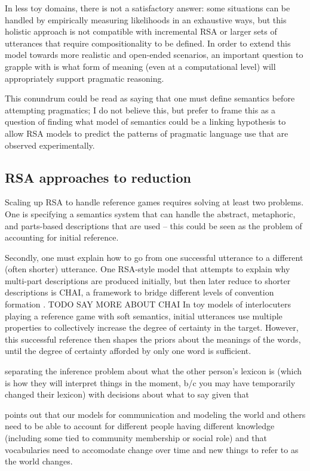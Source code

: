 \documentclass[]{article}
\begin{document}
 In less toy domains, there is not a satisfactory answer: some situations can be handled by empirically measuring likelihoods in an exhaustive ways, but this holistic approach is not compatible with incremental RSA or larger sets of utterances that require compositionality to be defined. In order to extend this model towards more realistic and open-ended scenarios, an important question to grapple with is what form of meaning (even at a computational level) will appropriately support pragmatic reasoning. 
 
This conundrum could be read as saying that one must define semantics before attempting pragmatics; I do not believe this, but prefer to frame this as a question of finding what model of semantics could be a linking hypothesis to allow RSA models to predict the patterns of pragmatic language use that are observed experimentally. 


\subsection{RSA approaches to reduction}
Scaling up RSA to handle reference games requires solving at least two problems. One is specifying a semantics system that can handle the abstract, metaphoric, and parts-based descriptions that are used -- this could be seen as the problem of accounting for initial reference. 

Secondly, one must explain how to go from one successful utterance to a different (often shorter) utterance. One RSA-style model that attempts to explain why multi-part descriptions are produced initially, but then later reduce to shorter descriptions is CHAI,  a framework to bridge different levels of convention formation \cite{hawkins2021}. TODO SAY MORE ABOUT CHAI In toy models of interlocuters playing a reference game with soft semantics, initial utterances use multiple properties to collectively increase the degree of certainty in the target. However, this successful reference then shapes the priors about the meanings of the words, until the degree of certainty afforded by only one word is sufficient. 

\cite{hawkins2021} separating the inference problem about what the other person's lexicon is (which is how they will interpret things in the moment, b/c you may have temporarily changed their lexicon) with decisions about what to say given that 

\cite{hawkins2021} points out that our models for communication and modeling the world and others need to be able to account for different people having different knowledge (including some tied to community membership or social role) and that vocabularies need to accomodate change over time and new things to refer to as the world changes. 
\end{document}
